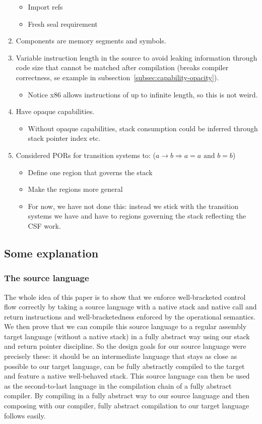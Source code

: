 \documentclass[a4paper]{article}
\begin{document}
\begin{enumerate}
\begin{itemize}
  \item Import refs
  \item Fresh seal requirement
  \end{itemize}
\item Components are memory segments and symbols.
\item Variable instruction length in the source to avoid leaking information through code size that cannot be matched after compilation (breaks compiler correctness, se example in subsection~\ref{subsec:capability-opacity}).
  \begin{itemize}
  \item Notice x86 allows instructions of up to infinite length, so this is not weird.
  \end{itemize}
\item Have opaque capabilities.
  \begin{itemize}
  \item Without opaque capabilities, stack consumption could be inferred through stack pointer index etc.
  \end{itemize}
\item Considered PORs for transition systems to: ($a \rightarrow b \Rightarrow a = a \text{ and } b = b$)
  \begin{itemize}
  \item Define one region that governs the stack
  \item Make the regions more general
  \item For now, we have not done this: instead we stick with the transition systems we have and have to regions governing the stack reflecting the CSF work.
  \end{itemize}
\end{enumerate}

\subsection{Some explanation}
\subsubsection{The source language}
The whole idea of this paper is to show that we enforce well-bracketed control flow correctly by taking a source language with a native stack and native call and return instructions and well-bracketedness enforced by the operational semantics.
We then prove that we can compile this source language to a regular assembly target language (without a native stack) in a fully abstract way using our stack and return pointer discipline.
So the design goals for our source language were precisely these: it should be an intermediate language that stays as close as possible to our target language, can be fully abstractly compiled to the target and feature a native well-behaved stack.
This source language can then be used as the second-to-last language in the compilation chain of a fully abstract compiler.
By compiling in a fully abstract way to our source language and then composing with our compiler, fully abstract compilation to our target language follows easily.
\end{document}
